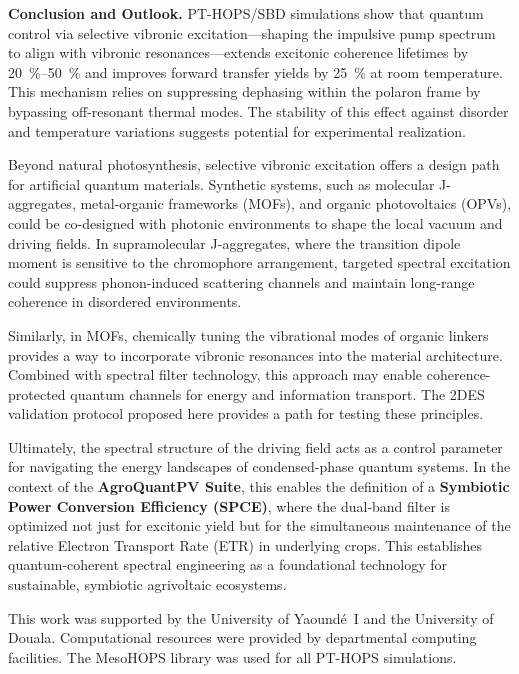 \documentclass[journal=jpcl,manuscript=letter]{achemso}
\begin{document}
\textbf{Conclusion and Outlook.}
PT-HOPS/SBD simulations show that quantum control via selective vibronic excitation---shaping the impulsive pump spectrum to align with vibronic resonances---extends excitonic coherence lifetimes by \SIrange{20}{50}{\percent} and improves forward transfer yields by \SI{25}{\percent} at room temperature. This mechanism relies on suppressing dephasing within the polaron frame by bypassing off-resonant thermal modes. The stability of this effect against disorder and temperature variations suggests potential for experimental realization.

Beyond natural photosynthesis, selective vibronic excitation offers a design path for artificial quantum materials. Synthetic systems, such as molecular J-aggregates, metal-organic frameworks (MOFs), and organic photovoltaics (OPVs), could be co-designed with photonic environments to shape the local vacuum and driving fields. In supramolecular J-aggregates, where the transition dipole moment is sensitive to the chromophore arrangement, targeted spectral excitation could suppress phonon-induced scattering channels and maintain long-range coherence in disordered environments.

Similarly, in MOFs, chemically tuning the vibrational modes of organic linkers provides a way to incorporate vibronic resonances into the material architecture. Combined with spectral filter technology, this approach may enable coherence-protected quantum channels for energy and information transport. The 2DES validation protocol proposed here provides a path for testing these principles. 

Ultimately, the spectral structure of the driving field acts as a control parameter for navigating the energy landscapes of condensed-phase quantum systems. In the context of the \textbf{AgroQuantPV Suite}, this enables the definition of a \textbf{Symbiotic Power Conversion Efficiency (SPCE)}, where the dual-band filter is optimized not just for excitonic yield but for the simultaneous maintenance of the relative Electron Transport Rate (ETR) in underlying crops. This establishes quantum-coherent spectral engineering as a foundational technology for sustainable, symbiotic agrivoltaic ecosystems.


\begin{acknowledgement}
This work was supported by the University of Yaoundé~I and the University of Douala. Computational resources were provided by departmental computing facilities. The MesoHOPS library was used for all PT-HOPS simulations.
\end{acknowledgement}
\end{document}
